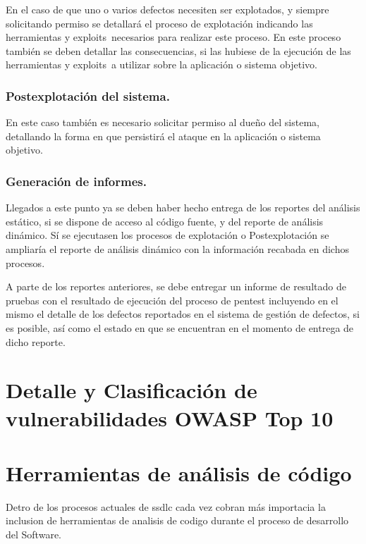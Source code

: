 En el caso de que uno o varios defectos necesiten ser explotados, y siempre solicitando permiso se detallará 
el proceso de explotación indicando las herramientas y \glspl{exploit} necesarios para realizar este proceso. 
En este proceso también se deben detallar las consecuencias, si las hubiese de la ejecución de las herramientas y 
exploits a utilizar sobre la aplicación o sistema objetivo.

\subsubsection{Postexplotación del sistema.}

En este caso también es necesario solicitar permiso al dueño del sistema, detallando 
la forma en que persistirá el ataque en la aplicación o sistema objetivo.

\subsubsection{Generación de informes.}

Llegados a este punto ya se deben haber hecho entrega de los reportes del análisis estático, si se dispone de acceso al código fuente, y del reporte de análisis dinámico. Sí se ejecutasen los procesos de explotación o Postexplotación se ampliaría el reporte de análisis dinámico con la información recabada en dichos procesos.

A parte de los reportes anteriores, se debe entregar un informe de resultado de 
pruebas con el resultado de ejecución del proceso de pentest incluyendo en 
el mismo el detalle de los defectos reportados en el sistema de gestión de 
defectos, si es posible, así como el estado en que se encuentran en el momento
de entrega de dicho reporte.

\clearpage
\newpage

\section{Detalle y Clasificación de vulnerabilidades OWASP Top 10}



\section{Herramientas de análisis de código}

Detro de los procesos actuales de \gls{ssdlc} cada vez cobran más importacia la inclusion de herramientas de analisis de codigo durante el proceso de desarrollo del Software.

